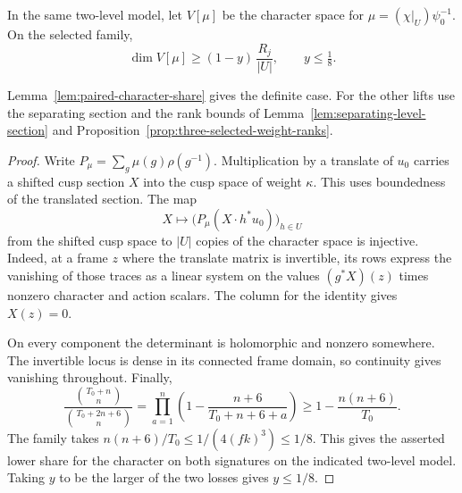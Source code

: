 


\begin{proposition}
\label{prop:paired-character-share}
In the same two-level model, let \(V[\mu]\) be the character space for \(\mu=(\chi|_U)\psi_0^{-1}\). On the selected family,
\[
 \dim V[\mu]\ge(1-y)\,\frac{R_j}{|U|},\qquad y\le\tfrac18.
\]

Lemma~\ref{lem:paired-character-share} gives the definite case.
For the other lifts use the separating section and the rank bounds
of Lemma~\ref{lem:separating-level-section} and
Proposition~\ref{prop:three-selected-weight-ranks}.
\end{proposition}

\begin{proof}
Write \(P_\mu=\sum_g\mu(g)\rho(g^{-1})\).
Multiplication by a translate of \(u_0\) carries a shifted
cusp section \(X\) into the cusp space of weight \(\kappa\).
This uses boundedness of the translated section.
The map
\[
 X\longmapsto\big(P_\mu(X\cdot h^*u_0)\big)_{h\in U}
\]
from the shifted cusp space to \(|U|\) copies of the
character space is injective. Indeed, at a frame \(z\)
where the translate matrix is invertible, its rows express
the vanishing of those traces as a linear system on the
values \((g^*X)(z)\) times nonzero character and action
scalars. The column for the identity gives \(X(z)=0\).

On every component the determinant is holomorphic and
nonzero somewhere. The invertible locus is dense in its
connected frame domain, so continuity gives vanishing
throughout. Finally,
\[
 \frac{\binom{T_0+n}{n}}{\binom{T_0+2n+6}{n}}
   =\prod_{a=1}^{n}
       \left(1-\frac{n+6}{T_0+n+6+a}\right)
   \ge 1-\frac{n(n+6)}{T_0}.
\]
The family takes \(n(n+6)/T_0\le1/(4(fk)^3)\le1/8\).
This gives the asserted lower share for the character on
both signatures on the indicated two-level model. Taking \(y\) to be the
larger of the two losses gives \(y\le1/8\).
\end{proof}


